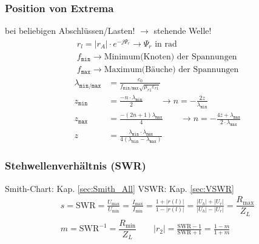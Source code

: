 \subsubsection{Position von Extrema}
bei beliebigen Abschlüssen/Lasten! $ \rightarrow $ stehende Welle!
\begin{gather*}
	\boxed{r_{l} = |r_A|\cdot e^{-j\Psi_r}}\rightarrow\Psi_r\text{ in rad}\\
	f_\texttt{min}\rightarrow \text{Minimum(Knoten) der Spannungen}\\
	f_\texttt{max}\rightarrow \text{Maximum(Bäuche) der Spannungen}
\end{gather*}
\begin{align*}
	\lambda_\texttt{min/max} & = \frac{c_0}{f_\texttt{min/max}\sqrt{\mu_{r1}\varepsilon_{r1}}}                                                                                                 \\
	z_\texttt{min}           & =\frac{-n\cdot\lambda_\texttt{min}}{2}                                        \qquad\rightarrow n = -\frac{2z}{\lambda_\texttt{min}}                            \\
	z_\texttt{max}           & =\frac{-(2n+1)\lambda_\texttt{max}}{4}                                        \qquad\rightarrow n = -\frac{4z+\lambda_\texttt{max}}{2\cdot\lambda_\texttt{max}} \\
	z                        & = \frac{\lambda_\texttt{min}\cdot\lambda_\texttt{max}}{4(\lambda_\texttt{min}-\lambda_\texttt{max})}
\end{align*}

\subsubsection{Stehwellenverhältnis (SWR)}
Smith-Chart: Kap. \ref{sec:Smith_All} \qquad VSWR: Kap. \ref{sec:VSWR}
\begin{align*}
	&s = \mathrm{SWR}       = \frac{U_\text{max}}{U_\text{min}} = \frac{I_\text{max}}{I_\text{min}} = \frac{1+|r(l)|}{1-|r(l)|} = \frac{|U_h|+|U_r|}{|U_h|-|U_r|}= \dfrac{R_{\text{max}}}{Z_L}&                                                        \\
	&m = \mathrm{SWR}^{-1} = \dfrac{R_{\text{min}}}{Z_L} \qquad |r_2| = \frac{\text{SWR}-1}{\text{SWR}+1} = \frac{1-m}{1+m} &
\end{align*}

